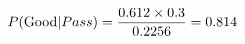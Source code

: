 \documentclass[preview]{standalone}
\begin{document}
\begin{align*}
\special{dvisvgm:raw <g id='unique000'>}P(\mathrm{Good}|Pass) = \frac{0.612\times0.3}{0.2256} = 0.814\special{dvisvgm:raw </g>}
\end{align*}
\end{document}
